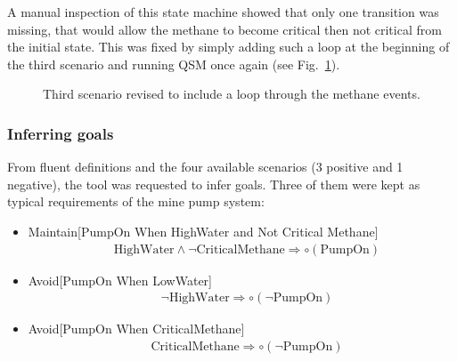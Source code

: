 A manual inspection of this state machine showed that only one transition was missing, that would allow the methane to become critical then not critical from the initial state. This was fixed by simply adding such a loop at the beginning of the third scenario and running QSM once again (see Fig.~\ref{image:minepump-scenario-3-bis}).

\begin{figure}[H]
\centering
{}
\caption{Third scenario revised to include a loop through the methane events.\label{image:minepump-scenario-3-bis}}
\end{figure}

\subsubsection*{Inferring goals}

From fluent definitions and the four available scenarios (3 positive and 1 negative), the tool was requested to infer goals. Three of them were kept as typical requirements of the mine pump system:
\begin{itemize}

\item Maintain[PumpOn When HighWater and Not Critical Methane]
\begin{align*}
&\mbox{HighWater} \wedge \neg \mbox{CriticalMethane} \Rightarrow \circ(\mbox{PumpOn})
\end{align*}

\item Avoid[PumpOn When LowWater]
\begin{align*}
&\neg \mbox{HighWater} \Rightarrow \circ(\neg \mbox{PumpOn})
\end{align*}

\item Avoid[PumpOn When CriticalMethane]
\begin{align*}
&\mbox{CriticalMethane} \Rightarrow \circ(\neg \mbox{PumpOn})
\end{align*}

\end{itemize}


